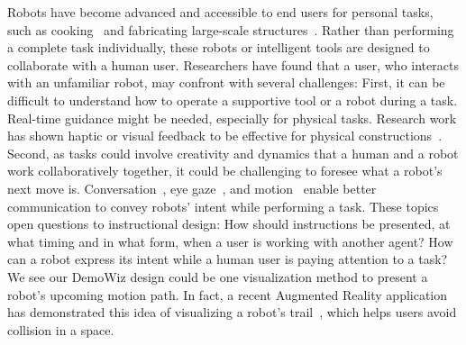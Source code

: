 Robots have become advanced and accessible to end users for personal tasks, such as cooking~\cite{Cha:2015:RHQ:2696454.2696465,Sugiura:2010:CRD:1753326.1753693} and fabricating large-scale structures~\cite{Vasey:2016:HHR:2897839.2927404}. Rather than performing a complete task individually, these robots or intelligent tools are designed to collaborate with a human user. Researchers have found that a user, who interacts with an unfamiliar robot, may confront with several challenges:
%
First, it can be difficult to understand how to operate a supportive tool or a robot during a task. Real-time guidance might be needed, especially for physical tasks. Research work has shown haptic or visual feedback to be effective for physical constructions~\cite{Agrawal:2015:PPS:2807442.2807505,Zoran:2013:FFD:2470654.2481361,Schoop:2016:DSS:2851581.2892429}.
%
Second, as tasks could involve creativity and dynamics that a human and a robot work collaboratively together, it could be challenging to foresee what a robot's next move is. Conversation~\cite{ChaoSimonSays11}, eye gaze~\cite{Andrist:2014:CGA:2559636.2559666}, and motion~\cite{Dragan:2015:ERM:2696454.2696473,Szafir:2014:CIA:2559636.2559672} enable better communication to convey robots' intent while performing a task.
%
These topics open questions to instructional design:
How should instructions be presented, at what timing and in what form, when a user is working with another agent? How can a robot express its intent while a human user is paying attention to a task?
%
We see our DemoWiz design could be one visualization method to present a robot's upcoming motion path. In fact, a recent Augmented Reality application has demonstrated this idea of visualizing a robot's trail~\cite{HoloLensRobot}, which helps users avoid collision in a space.

